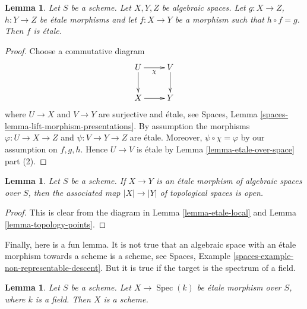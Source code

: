 \documentclass{stacks-project}
\theoremstyle{plain}
\newtheorem{lemma}[subsection]{Lemma}
\theoremstyle{definition}
\theoremstyle{remark}
\numberwithin{equation}{subsection}
\def\Spec{\mathop{\mathrm{Spec}}}
\begin{document}
\begin{lemma}
\label{lemma-etale-permanence}
Let $S$ be a scheme. Let $X, Y, Z$ be algebraic spaces.
Let $g : X \to Z$, $h : Y \to Z$ be \'etale morphisms and let
$f : X \to Y$ be a morphism such that $h \circ f = g$.
Then $f$ is \'etale.
\end{lemma}

\begin{proof}
Choose a commutative diagram
$$
\xymatrix{
U \ar[d] \ar[r]_\chi & V \ar[d] \\
X \ar[r] & Y
}
$$
where $U \to X$ and $V \to Y$ are surjective and \'etale, see
Spaces, Lemma \ref{spaces-lemma-lift-morphism-presentations}.
By assumption the morphisms $\varphi : U \to X \to Z$ and
$\psi : V \to Y \to Z$ are \'etale. Moreover, $\psi \circ \chi = \varphi$
by our assumption on $f, g, h$.
Hence $U \to V$ is \'etale by Lemma \ref{lemma-etale-over-space}
part (2).
\end{proof}

\begin{lemma}
\label{lemma-etale-open}
Let $S$ be a scheme.
If $X \to Y$ is an \'etale morphism of algebraic spaces over $S$,
then the associated map $|X| \to |Y|$ of topological spaces
is open.
\end{lemma}

\begin{proof}
This is clear from the diagram in
Lemma \ref{lemma-etale-local}
and
Lemma \ref{lemma-topology-points}.
\end{proof}

\noindent
Finally, here is a fun lemma. It is not true that an algebraic space
with an \'etale morphism towards a scheme is a scheme, see
Spaces, Example \ref{spaces-example-non-representable-descent}.
But it is true if the target is the spectrum of a field.

\begin{lemma}
\label{lemma-etale-over-field-scheme}
Let $S$ be a scheme. Let $X \to \Spec(k)$
be \'etale morphism over $S$, where $k$ is a field.
Then $X$ is a scheme.
\end{lemma}
\end{document}
